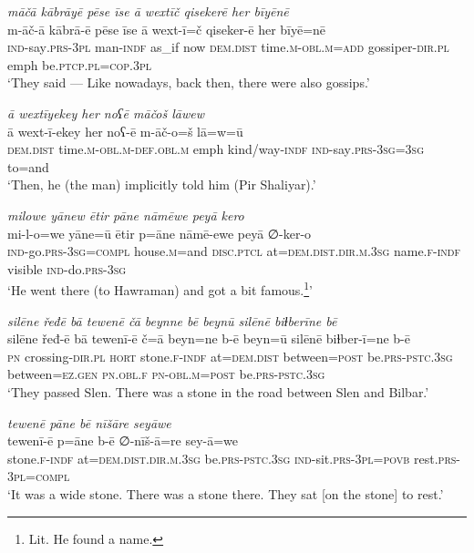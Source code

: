 \ea \label{ŽP.125}
\textit{māčā kābrāyē pēse īse ā wextīč qisekerē her bīyēnē} \\ 
\gll m-āč-ā kābrā-ē pēse īse ā wext-ī=č qiseker-ē her bīyē=nē \\ 
 \textsc{ind-}say\textsc{.prs}\textsc{-3pl} man\textsc{-indf} as\_if now \textsc{dem.dist} time\textsc{.m}\textsc{-obl}\textsc{.m}\textsc{=add} gossiper\textsc{-dir}\textsc{.pl} emph be\textsc{.ptcp}\textsc{.pl}\textsc{=cop}\textsc{.3pl} \\ 
\glt `They said — Like nowadays, back then, there were also gossips.'
\z 
 
\ea \label{ŽP.137}
\textit{ā wextīyekey her noʕē māčoš lāwew} \\ 
\gll ā wext-ī-ekey her noʕ-ē m-āč-o=š lā=w=ū \\ 
 \textsc{dem.dist} time\textsc{.m}\textsc{-obl}\textsc{.m}\textsc{-def}\textsc{.obl}\textsc{.m} emph kind/way\textsc{-indf} \textsc{ind-}say\textsc{.prs}\textsc{-3sg}\textsc{=3sg} to=and \\ 
\glt `Then, he (the man) implicitly told him (Pir Shaliyar).'
\z 
 
\ea \label{ŽP.143}
\textit{milowe yānew ētir pāne nāmēwe peyā kero} \\ 
\gll mi-l-o=we yāne=ū ētir p=āne nāmē-ewe peyā ∅-ker-o \\ 
 \textsc{ind-}go\textsc{.prs}\textsc{-3sg}\textsc{=compl} house\textsc{.m}=and \textsc{disc.ptcl} at=\textsc{dem.dist}\textsc{.dir}\textsc{.m}\textsc{.3sg} name\textsc{.f}\textsc{-indf} visible \textsc{ind-}do\textsc{.prs}\textsc{-3sg} \\ 
\glt `He went there (to Hawraman) and got a bit famous.\footnote{Lit. He found a name.}'
\z 
 
\ea \label{ŽP.167}
\textit{silēne řeđē bā tewenē čā beynne bē beynū silēnē biɫberīne bē} \\ 
\gll silēne řeđ-ē bā tewenī-ē č=ā beyn=ne b-ē beyn=ū silēnē biɫber-ī=ne b-ē \\ 
 \textsc{pn} crossing\textsc{-dir}\textsc{.pl} \textsc{hort} stone\textsc{.f}\textsc{-indf} at=\textsc{dem.dist} between\textsc{=\textsc{post}} be\textsc{.prs}\textsc{-pstc}\textsc{.3sg} between\textsc{\textsc{=ez.gen}} \textsc{pn}\textsc{.obl}\textsc{.f} \textsc{pn}\textsc{-obl}\textsc{.m}\textsc{=\textsc{post}} be\textsc{.prs}\textsc{-pstc}\textsc{.3sg} \\ 
\glt `They passed Slen. There was a stone in the road between Slen and Bilbar.'
\z 
 
\ea \label{ŽP.171}
\textit{tewenē pāne bē nīšāre seyāwe} \\ 
\gll tewenī-ē p=āne b-ē ∅-nīš-ā=re sey-ā=we \\ 
 stone\textsc{.f}\textsc{-indf} at=\textsc{dem.dist}\textsc{.dir}\textsc{.m}\textsc{.3sg} be\textsc{.prs}\textsc{-pstc}\textsc{.3sg} \textsc{ind-}sit\textsc{.prs}\textsc{-3pl}\textsc{=\textsc{povb}} rest\textsc{.prs}\textsc{-3pl}\textsc{=compl} \\ 
\glt `It was a wide stone. There was a stone there. They sat [on the stone] to rest.'
\z 
 
